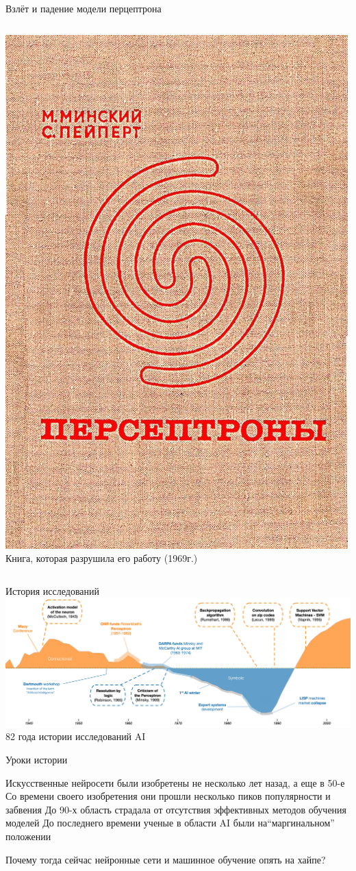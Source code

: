 \documentclass[aspectratio=169, professionalfonts]{beamer}
\begin{document}
\begin{frame}{Взлёт и падение модели перцептрона}
\begin{columns}
\begin{column}{.49\linewidth}
            \includegraphics[width=.52\linewidth]{figures/fig46-perceptrons.jpg} \\
            Книга, которая разрушила его работу (1969г.)
        \end{column}
    \end{columns}
\end{frame}

\begin{frame}{История исследований}
    \centering
    \includegraphics[width=\linewidth]{figures/fig44-research-history.jpg} \\
    82 года истории исследований AI
\end{frame}

\begin{frame}{Уроки истории}
    \large
    \begin{outline}
        \1 Искусственные нейросети были изобретены не несколько лет назад, а еще в 50-е
        \1 Со времени своего изобретения они прошли несколько пиков популярности и забвения
        \1 До 90-х область страдала от отсутствия эффективных методов обучения моделей
        \1 До последнего времени ученые в области AI были на``маргинальном'' положении
    \end{outline}

    Почему тогда сейчас нейронные сети и машинное обучение опять на хайпе?
\end{frame}
\end{document}
